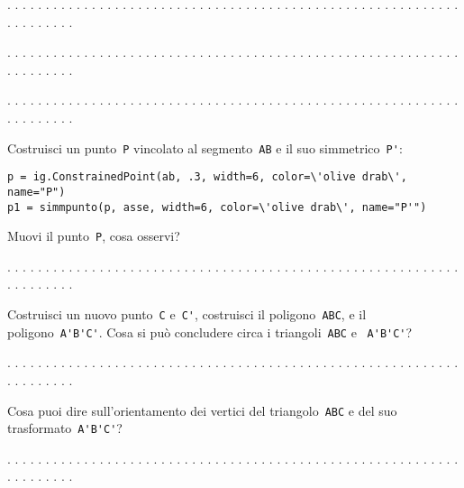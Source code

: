 . . . . . . . . . . . . . . . . . . . . . . . . . . . . . . . . . . . . . . . .
. . . . . . . . . . . . . . . . . . . . . . . . . . . .

. . . . . . . . . . . . . . . . . . . . . . . . . . . . . . . . . . . . . . . .
. . . . . . . . . . . . . . . . . . . . . . . . . . . .

. . . . . . . . . . . . . . . . . . . . . . . . . . . . . . . . . . . . . . . .
. . . . . . . . . . . . . . . . . . . . . . . . . . . .

Costruisci un punto~\lstinline{P} vincolato al segmento~\lstinline{AB} e il suo
simmetrico~\lstinline{P'}:

\begin{lstlisting}
p = ig.ConstrainedPoint(ab, .3, width=6, color=\'olive drab\', name="P")
p1 = simmpunto(p, asse, width=6, color=\'olive drab\', name="P'")
\end{lstlisting}

Muovi il punto~\lstinline{P}, cosa osservi?

. . . . . . . . . . . . . . . . . . . . . . . . . . . . . . . . . . . . . . . .
. . . . . . . . . . . . . . . . . . . . . . . . . . . .

Costruisci un nuovo punto~\lstinline{C} e~\lstinline{C'}, costruisci il 
poligono~\lstinline{ABC}, e il poligono~\lstinline{A'B'C'}.
Cosa si può concludere circa i triangoli~\lstinline{ABC} e ~\lstinline{A'B'C'}?

. . . . . . . . . . . . . . . . . . . . . . . . . . . . . . . . . . . . . . . .
. . . . . . . . . . . . . . . . . . . . . . . . . . . .

Cosa puoi dire sull'orientamento dei vertici del triangolo~\lstinline{ABC} e 
del 
suo
trasformato~\lstinline{A'B'C'}?

. . . . . . . . . . . . . . . . . . . . . . . . . . . . . . . . . . . . . . . .
. . . . . . . . . . . . . . . . . . . . . . . . . . . .

